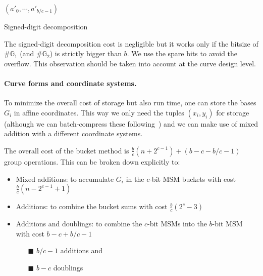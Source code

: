 \documentclass[journal=tches,spthm]{iacrtrans}
\newcommand{\G}{\ensuremath{\mathbb G}}
\begin{document}
\begin{algorithm}[hbt]
  \SetAlgoLined
  \Return $(a'_0, \cdots, a'_{b/c-1})$\;
  \caption{Signed-digit decomposition}
  \label{alg:signed-set}
\end{algorithm}

The signed-digit decomposition cost is negligible but it works only if the
bitsize of $\#\G_1$ (and $\#\G_2$) is strictly bigger than $b$. We use the
spare bits to avoid the overflow. This observation should be taken into account at
the curve design level.

\paragraph{Curve forms and coordinate systems.}
To minimize the overall cost of storage but also run time, one can store the bases
$G_i$ in affine coordinates. This way we only need the tuples $(x_i,y_i)$ for
storage (although we can batch-compress these
following~\cite{EPRINT:Koshelev21e}) and we can make use of mixed addition with
a different coordinate systems.

The overall cost of the bucket method is $\frac{b}{c}(n+2^{c-1})+(b-c-b/c-1)$ group operations. This can be broken down explicitly to:
\begin{itemize}
    \item Mixed additions: to accumulate $G_i$ in the $c$-bit MSM buckets with cost $\frac{b}{c}(n-2^{c-1}+1)$
    \item Additions: to combine the bucket sums with cost $\frac{b}{c}(2^c-3)$
    \item Additions and doublings: to combine the $c$-bit MSMs into the $b$-bit MSM with cost $b-c+b/c-1$
        \begin{itemize}
            \item[$\blacksquare$] $b/c-1$ additions and
            \item[$\blacksquare$] $b-c$ doublings
        \end{itemize}
\end{itemize}
\end{document}
